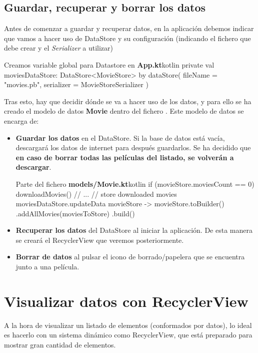 \documentclass{\ClassPath/viu-tfm-template}
\begin{document}
\subsection{Guardar, recuperar y borrar los datos}

Antes de comenzar a guardar y recuperar datos, en la aplicación debemos indicar que vamos a hacer uso de DataStore y su configuración (indicando el fichero que debe crear y el \textit{Serializer} a utilizar)

\begin{mycode}{Creamos variable global para Datastore en \textbf{App.kt}}{kotlin}{}
private val moviesDataStore: DataStore<MovieStore> by dataStore(
    fileName = "movies.pb",
    serializer = MovieStoreSerializer
)
\end{mycode}

Tras esto, hay que decidir dónde se va a hacer uso de los datos, y para ello se ha creado el modelo de datos \textbf{Movie} dentro del fichero . Este modelo de datos se encarga de:

\begin{itemize}
    \item \textbf{Guardar los datos} en el DataStore. Si la base de datos está vacía, descargará los datos de internet para después guardarlos. Se ha decidido que \textbf{en caso de borrar todas las películas del listado, se volverán a descargar}.
\begin{mycode}{Parte del fichero \textbf{models/Movie.kt}}{kotlin}{}
if (movieStore.moviesCount == 0) {
    downloadMovies()
}
// ...
// store downloaded movies
moviesDataStore.updateData { movieStore ->
    movieStore.toBuilder()
    .addAllMovies(moviesToStore)
    .build()
}
\end{mycode}
    \item \textbf{Recuperar los datos} del DataStore al iniciar la aplicación. De esta manera se creará el RecyclerView que veremos posteriormente.

    \item \textbf{Borrar de datos} al pulsar el icono de borrado/papelera que se encuentra junto a una película.
\end{itemize}


\section{Visualizar datos con RecyclerView}

A la hora de visualizar un listado de elementos (conformados por datos), lo ideal es hacerlo con un sistema dinámico como RecyclerView, que está preparado para mostrar gran cantidad de elementos.
\end{document}
